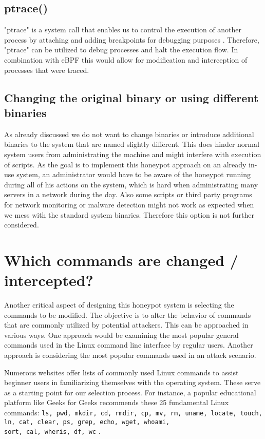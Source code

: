 \subsection{ptrace()}
"ptrace" is a system call that enables us to control the execution of another process by attaching and adding breakpoints for debugging purposes \cite{ptrace}. Therefore, "ptrace" can be utilized to debug processes and halt the execution flow. In combination with eBPF this would allow for modification and interception of processes that were traced. 

\subsection{Changing the original binary or using different binaries}
As already discussed we do not want to change binaries or introduce additional binaries to the system that are named slightly different. This does hinder normal system users from administrating the machine and might interfere with execution of scripts. As the goal is to implement this honeypot approach on an already in-use system, an administrator would have to be aware of the honeypot running during all of his actions on the system, which is hard when administrating many servers in a network during the day. Also some scripts or third party programs for network monitoring or malware detection might not work as expected when we mess with the standard system binaries. Therefore this option is not further considered.

\section{Which commands are changed / intercepted?}
Another critical aspect of designing this honeypot system is selecting the commands to be modified. The objective is to alter the behavior of commands that are commonly utilized by potential attackers. This can be approached in various ways. 
One approach would be examining the most popular general commands used in the Linux command line interface by regular users. Another approach is considering the most popular commands used in an attack scenario. 

Numerous websites offer lists of commonly used Linux commands to assist beginner users in familiarizing themselves with the operating system. These serve as a starting point for our selection process. For instance, a popular educational platform like Geeks for Geeks recommends these 25 fundamental Linux commands:\newline 
\texttt{ls, pwd, mkdir, cd, rmdir, cp, mv, rm, uname, locate, touch, ln, cat, clear, ps, grep, echo, wget, whoami, \\sort, cal, wheris, df, wc} \cite{noauthor_25_2023}.

